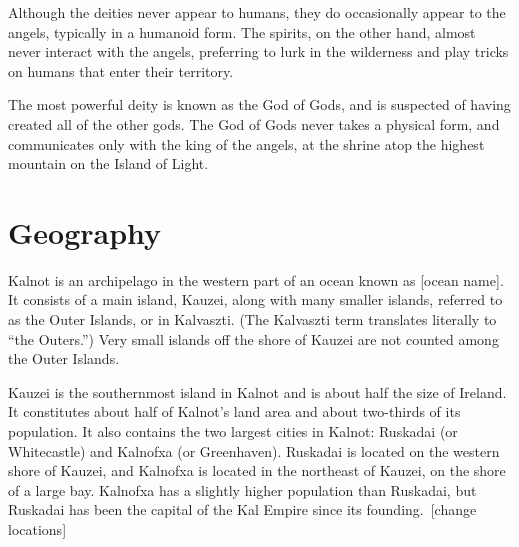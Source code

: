 \documentclass{article}
\begin{document}
Although the deities never appear to humans, they do occasionally appear to the angels, typically in a humanoid form. The spirits, on the other hand, almost never interact with the angels, preferring to lurk in the wilderness and play tricks on humans that enter their territory.

The most powerful deity is known as the God of Gods, and is suspected of having created all of the other gods. The God of Gods never takes a physical form, and communicates only with the king of the angels, at the shrine atop the highest mountain on the Island of Light.

\section{Geography}


Kalnot is an archipelago in the western part of an ocean known as [ocean name]. It consists of a main island, Kauzei, along with many smaller islands, referred to as the Outer Islands, or  in Kalvaszti. (The Kalvaszti term translates literally to ``the Outers.'') Very small islands off the shore of Kauzei are not counted among the Outer Islands.

Kauzei is the southernmost island in Kalnot and is about half the size of Ireland. It constitutes about half of Kalnot's land area and about two-thirds of its population. It also contains the two largest cities in Kalnot: Ruskadai (or Whitecastle) and Kalnofxa (or Greenhaven). Ruskadai is located on the western shore of Kauzei, and Kalnofxa is located in the northeast of Kauzei, on the shore of a large bay. Kalnofxa has a slightly higher population than Ruskadai, but Ruskadai has been the capital of the Kal Empire since its founding.\ [change locations]
\end{document}
